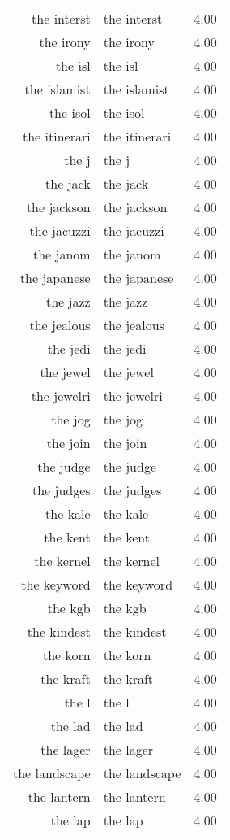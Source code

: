 \begin{table}[ht]
\begin{tabular}{rlr}
  the interst & the interst & 4.00 \\ 
  the irony & the irony & 4.00 \\ 
  the isl & the isl & 4.00 \\ 
  the islamist & the islamist & 4.00 \\ 
  the isol & the isol & 4.00 \\ 
  the itinerari & the itinerari & 4.00 \\ 
  the j & the j & 4.00 \\ 
  the jack & the jack & 4.00 \\ 
  the jackson & the jackson & 4.00 \\ 
  the jacuzzi & the jacuzzi & 4.00 \\ 
  the janom & the janom & 4.00 \\ 
  the japanese & the japanese & 4.00 \\ 
  the jazz & the jazz & 4.00 \\ 
  the jealous & the jealous & 4.00 \\ 
  the jedi & the jedi & 4.00 \\ 
  the jewel & the jewel & 4.00 \\ 
  the jewelri & the jewelri & 4.00 \\ 
  the jog & the jog & 4.00 \\ 
  the join & the join & 4.00 \\ 
  the judge & the judge & 4.00 \\ 
  the judges & the judges & 4.00 \\ 
  the kale & the kale & 4.00 \\ 
  the kent & the kent & 4.00 \\ 
  the kernel & the kernel & 4.00 \\ 
  the keyword & the keyword & 4.00 \\ 
  the kgb & the kgb & 4.00 \\ 
  the kindest & the kindest & 4.00 \\ 
  the korn & the korn & 4.00 \\ 
  the kraft & the kraft & 4.00 \\ 
  the l & the l & 4.00 \\ 
  the lad & the lad & 4.00 \\ 
  the lager & the lager & 4.00 \\ 
  the landscape & the landscape & 4.00 \\ 
  the lantern & the lantern & 4.00 \\ 
  the lap & the lap & 4.00 \\ 

\end{tabular}
\end{table}
